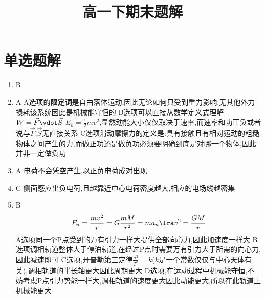 

\title{高一下期末题解}
\author{}


    \maketitle
    \tableofcontents
    \newpage

    \section{单选题解}

        \begin{enumerate}
            \item B 
            \item A     \newline
            A选项的\textbf{限定词}是自由落体运动,因此无论如何只受到重力影响,无其他外力损耗该系统因此是机械能守恒的   \newline 
            B选项可以直接从数学定义式理解$ W = \vec{F} \vdot \vec{S} $ \quad $ E_{k} = \frac{1}{2} m v^{2} $,显然动能大小仅仅取决于速率,而速率和功正负或者说与$\vec{F}$,$\vec{S}$无直接关系     \newline
            C选项滑动摩擦力的定义是:具有接触且有相对运动的粗糙物体之间产生的力,而做正功还是做负功必须要明确到底是对哪一个物体,因此并非一定做负功
            \item A     \newline
            电荷不会凭空产生,以正负电荷成对出现
            \item C     \newline 
            侧面感应出负电荷,且越靠近中心电荷密度越大,相应的电场线越密集
            \item B     
            $$
            F_{n} = \frac{m v^{2}}{r} = G\frac{mM}{r^{2}} = m a_{n} \lra v^{2} = \frac{GM}{r}
            $$
            A选项同一个P点受到的万有引力一样大提供全部向心力,因此加速度一样大   \newline
            B选项调相轨道整体大于停泊轨道,在经过P点时需要万有引力大于所需的向心力,因此减速即可  \newline
            C选项,开普勒第三定律$ \frac{a^{3}}{T^{2}} = k $($k$是一个常数仅仅与中心天体有关),调相轨道的半长轴更大因此周期更大   \newline
            D选项,在运动过程中机械能守恒,不妨考虑P点引力势能一样大,调相轨道的速度更大因此动能更大,所以在此轨道上机械能更大

\end{enumerate}
